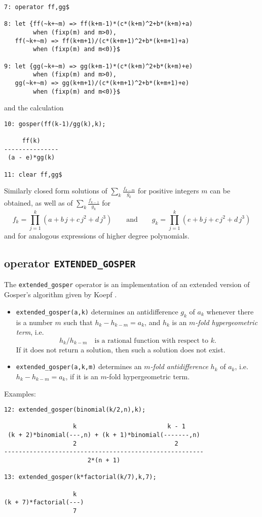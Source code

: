 {\small
\begin{verbatim}
7: operator ff,gg$

8: let {ff(~k+~m) => ff(k+m-1)*(c*(k+m)^2+b*(k+m)+a)
        when (fixp(m) and m>0),
   ff(~k+~m) => ff(k+m+1)/(c*(k+m+1)^2+b*(k+m+1)+a)
        when (fixp(m) and m<0)}$

9: let {gg(~k+~m) => gg(k+m-1)*(c*(k+m)^2+b*(k+m)+e)
        when (fixp(m) and m>0),
   gg(~k+~m) => gg(k+m+1)/(c*(k+m+1)^2+b*(k+m+1)+e)
        when (fixp(m) and m<0)}$
\end{verbatim}
}\noindent
and the calculation

{\small
\begin{verbatim}
10: gosper(ff(k-1)/gg(k),k);

     ff(k)
---------------
 (a - e)*gg(k)

11: clear ff,gg$
\end{verbatim}
}\noindent
Similarly closed form solutions of $\sum\nolimits_k\frac{f_{k-m}}{g_{k}}$
for positive integers $m$ can be obtained, as well as of
$\sum_k\frac{f_{k-1}}{g_{k}}$ for
\[
f_k=\prod_{j=1}^k (a+b\,j+c\,j^2+d\,j^3)
\quad\quad\mbox{and}\quad\quad
g_k=\prod_{j=1}^k (e+b\,j+c\,j^2+d\,j^3)
\]
and for analogous expressions of higher degree polynomials.

\subsection{\REDUCE{} operator {\tt EXTENDED\_GOSPER}}
The {\tt extended\_gosper} operator is an implementation of an extended
version of Gosper's algorithm given by Koepf \cite{Koepf:94b}.
\begin{itemize}
\item
{\tt extended\_gosper(a,k)} determines an antidifference $g_k$ of $a_k$
whenever there is a number $m$ such that $h_{k}-h_{k-m}=a_k$, and $h_k$ is an
\textsl{$m$-fold hypergeometric term}, i.e.
\[
h_{k}/h_{k-m}\quad\mbox{is a rational function with respect to $k$.}
\]
If it does not return a solution, then such a solution does not exist.
\item
{\tt extended\_gosper(a,k,m)}
determines an \textsl{$m$-fold antidifference} $h_k$ of $a_k$,
i.e.\ $h_{k}-h_{k-m}=a_k$, if it is an $m$-fold hypergeometric term.
\end{itemize}
Examples:

{\small
\begin{verbatim}
12: extended_gosper(binomial(k/2,n),k);

                   k                         k - 1
 (k + 2)*binomial(---,n) + (k + 1)*binomial(-------,n)
                   2                           2
-------------------------------------------------------
                       2*(n + 1)

13: extended_gosper(k*factorial(k/7),k,7);

                   k
(k + 7)*factorial(---)
                   7
\end{verbatim}
}\noindent


